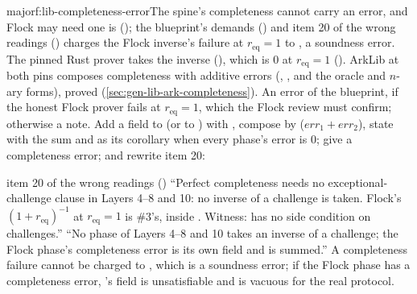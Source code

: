 \begin{finding}{major}{f:lib-completeness-error}{The spine's completeness cannot carry an error, and Flock may need one}
 \allowbreak{}\allowbreak{} is 
(\allowbreak{}\allowbreak{}\allowbreak{}); the blueprint's 
demands  () and item 20 of the wrong
readings () charges the Flock inverse's failure at $r_{\mathrm{eq}} = 1$ to
, a soundness error. The pinned Rust prover takes the inverse
(\allowbreak{}\allowbreak{}\allowbreak{}), which is $0$ at $r_{\mathrm{eq}} = 1$
(\allowbreak{}\allowbreak{}\allowbreak{}\allowbreak{}). ArkLib at both pins composes
completeness with additive errors (\allowbreak{}\allowbreak{}\allowbreak{}\allowbreak{},
, and the oracle and $n$-ary forms), proved
(\cref{sec:gen-lib-ark-completeness}).
 An error of the blueprint, if the honest Flock prover fails at
$r_{\mathrm{eq}} = 1$, which the Flock review must confirm; otherwise a note.
 Add a field  to  (or to
) with \allowbreak{}\allowbreak{},
compose by \allowbreak{}\allowbreak{}\allowbreak{}\allowbreak{} ($\mathit{err}_1 +
\mathit{err}_2$), state  with the sum and 
as its corollary when every phase's error is $0$; give  a completeness error;
and rewrite item 20:
\begin{change}{item 20 of the wrong readings ()}
\asis \enquote{Perfect completeness needs no exceptional-challenge clause in Layers 4--8 and 10: no
inverse of a challenge is taken. Flock's $(1 + r_{\mathrm{eq}})^{-1}$ at $r_{\mathrm{eq}} = 1$ is
\#3's, inside . Witness:  has no side condition on
challenges.}
\asproposed \enquote{No phase of Layers 4--8 and 10 takes an inverse of a challenge; the Flock
phase's completeness error is its own field and is summed.}
\reason A completeness failure cannot be charged to , which is a soundness error;
if the Flock phase has a completeness error, 's 
field is unsatisfiable and  is vacuous for the real protocol.
\end{change}
\end{finding}

